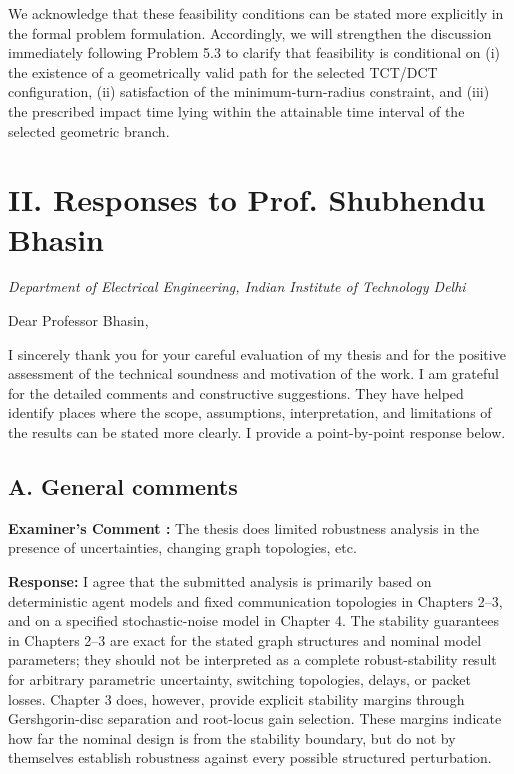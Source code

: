 \documentclass[11pt,a4paper]{article}
\newcounter{examcomment}
\renewcommand{\theexamcomment}{\arabic{examcomment}}
\newcommand{\comment}[1]{%
	\refstepcounter{examcomment}%
	\par\vspace{5pt}\noindent
	\colorbox{gray!13}{%
		\parbox{\dimexpr\linewidth-2\fboxsep}{%
			\textbf{Examiner's Comment \theexamcomment:} #1%
		}%
	}%
	\par
}
\newcounter{problem}
\newcommand{\response}{\par\textbf{Response:} }
\newcommand{\revision}{\par\textbf{Proposed thesis revision:} }
\begin{document}
We acknowledge that these feasibility conditions can be stated more explicitly in the formal problem formulation. Accordingly, we will strengthen the discussion immediately following Problem 5.3 to clarify that feasibility is conditional on (i) the existence of a geometrically valid path for the selected TCT/DCT configuration, (ii) satisfaction of the minimum-turn-radius constraint, and (iii) the prescribed impact time lying within the attainable time interval of the selected geometric branch.

\vspace{10pt}

\clearpage
\setcounter{examcomment}{0}
\section*{II. Responses to Prof. Shubhendu Bhasin}
\textit{Department of Electrical Engineering, Indian Institute of Technology Delhi}

Dear Professor Bhasin,

I sincerely thank you for your careful evaluation of my thesis and for the
positive assessment of the technical soundness and motivation of the work.
I am grateful for the detailed comments and constructive suggestions. They
have helped identify places where the scope, assumptions, interpretation,
and limitations of the results can be stated more clearly. I provide a
point-by-point response below.

\subsection*{A. General comments}
\comment{The thesis does limited robustness analysis in the presence of uncertainties, changing graph topologies, etc.}
\response
I agree that the submitted analysis is primarily based on deterministic agent models and fixed communication topologies in Chapters 2--3, and on a specified stochastic-noise model in Chapter 4. The stability guarantees in Chapters 2--3 are exact for the stated graph structures and nominal model parameters; they should not be interpreted as a complete robust-stability result for arbitrary parametric uncertainty, switching topologies, delays, or packet losses. Chapter 3 does, however, provide explicit stability margins through Gershgorin-disc separation and root-locus gain selection. These margins indicate how far the nominal design is from the stability boundary, but do not by themselves establish robustness against every possible structured perturbation.
\end{document}

